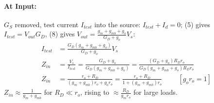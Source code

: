 \begin{enumerate}
    \paragraph{At Input:} \(G_S\) removed, test current \(I_{test}\) into the source:
    \(I_{test} + I_d = 0\); (5) gives \(I_{test} = V_{out} G_D\), (8) gives
    \(V_{out} = \frac{g_m + g_{mb} + g_o}{G_D + g_o} V_s\):
    \begin{align*}
      I_{test} &= \frac{G_D (g_m + g_{mb} + g_o)}{G_D + g_o} V_s \\
      Z_{in} &= \frac{V_s}{I_{test}} = \frac{G_D + g_o}{G_D (g_m + g_{mb} + g_o)}
              = \frac{(G_D + g_o) R_D r_o}{G_D (g_m + g_{mb} + g_o) R_D r_o} \\
      Z_{in} &= \frac{r_o + R_D}{(g_m + g_{mb}) r_o + g_o r_o} = \frac{r_o + R_D}{1 + (g_m + g_{mb}) r_o} \hspace{1cm} [g_o r_o = 1]
    \end{align*}
    \(Z_{in} \approx \frac{1}{g_m + g_{mb}}\) for \(R_D \ll r_o\), rising to \(\approx \frac{R_D}{g_m r_o}\) for large loads.

\end{enumerate}
